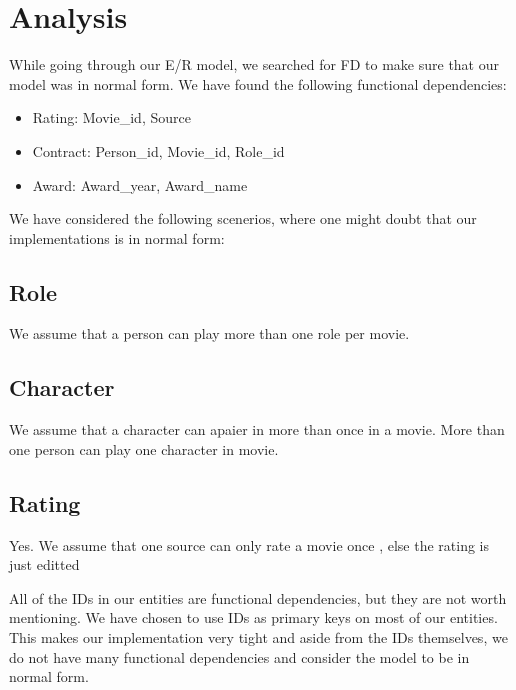 \section{Analysis}
While going through our E/R model, we searched for FD to make sure that our model was in normal form.
  We have found the following functional dependencies:
  \begin{itemize}
    \item Rating: Movie\_id, Source
    \item Contract: Person\_id, Movie\_id, Role\_id
    \item Award: Award\_year, Award\_name
  \end{itemize}
  We have considered the following scenerios, where one might doubt that our implementations is in normal form: \\
  \subsection{Role}
    \begin{itemize}
              {We assume that a person can play more than one role per movie.}
    \end{itemize}
  \subsection{Character}
    \begin{itemize}
              {We assume that a character can apaier in more than once in a movie.}
              {More than one person can play one character in movie.}
    \end{itemize}
  \subsection{Rating}
    \begin{itemize}
              {Yes. We assume that one source can only rate a movie once , else the rating is just editted}
    \end{itemize}
    All of the IDs in our entities are functional dependencies, but they are
    not worth mentioning.
    We have chosen to use IDs as primary keys on most of our entities. This
    makes our implementation very tight and aside from the IDs themselves, we
    do not have many functional dependencies and consider the model to be in normal form.
\newpage
